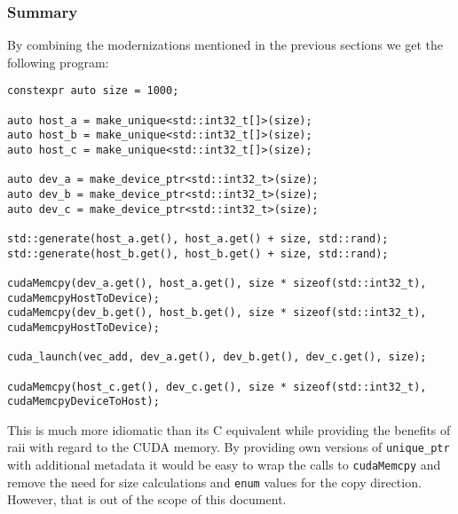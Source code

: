 \subsubsection{Summary}

By combining the modernizations mentioned in the previous sections we get the following program:

\begin{lstlisting}
constexpr auto size = 1000;

auto host_a = make_unique<std::int32_t[]>(size);
auto host_b = make_unique<std::int32_t[]>(size);
auto host_c = make_unique<std::int32_t[]>(size);

auto dev_a = make_device_ptr<std::int32_t>(size);
auto dev_b = make_device_ptr<std::int32_t>(size);
auto dev_c = make_device_ptr<std::int32_t>(size);

std::generate(host_a.get(), host_a.get() + size, std::rand);
std::generate(host_b.get(), host_b.get() + size, std::rand);

cudaMemcpy(dev_a.get(), host_a.get(), size * sizeof(std::int32_t), cudaMemcpyHostToDevice);
cudaMemcpy(dev_b.get(), host_b.get(), size * sizeof(std::int32_t), cudaMemcpyHostToDevice);

cuda_launch(vec_add, dev_a.get(), dev_b.get(), dev_c.get(), size);

cudaMemcpy(host_c.get(), dev_c.get(), size * sizeof(std::int32_t), cudaMemcpyDeviceToHost);
\end{lstlisting}

This is much more idiomatic than its C equivalent while providing the benefits of \gls{raii} with regard to the CUDA memory. By providing own versions of \texttt{unique\_ptr} with additional metadata it would be easy to wrap the calls to \texttt{cudaMemcpy} and remove the need for size calculations and \texttt{enum} values for the copy direction. However, that is out of the scope of this document.